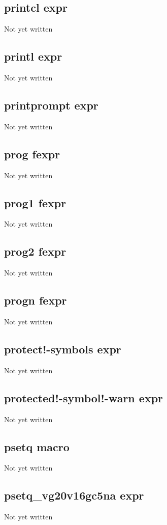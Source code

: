 \documentclass[a4paper,11pt]{article}
\begin{document}
\subsection{\ttfamily printcl expr}
Not yet written

\subsection{\ttfamily printl expr}
Not yet written

\subsection{\ttfamily printprompt expr}
Not yet written

\subsection{\ttfamily prog fexpr}
Not yet written

\subsection{\ttfamily prog1 fexpr}
Not yet written

\subsection{\ttfamily prog2 fexpr}
Not yet written

\subsection{\ttfamily progn fexpr}
Not yet written

\subsection{\ttfamily protect!-symbols expr}
Not yet written

\subsection{\ttfamily protected!-symbol!-warn expr}
Not yet written

\subsection{\ttfamily psetq macro}
Not yet written

\subsection{\ttfamily psetq\_vg20v16gc5na expr}
Not yet written
\end{document}
